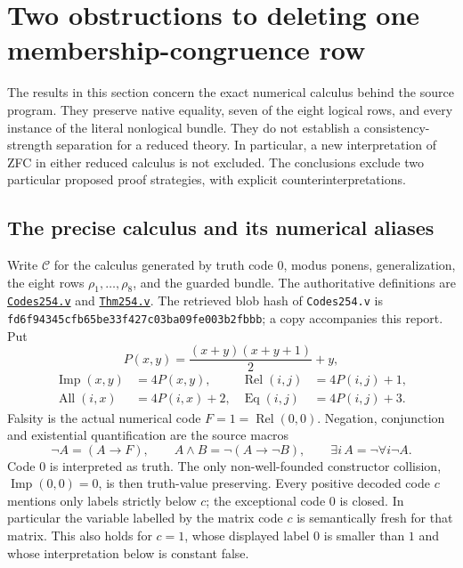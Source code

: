 \section{Two obstructions to deleting one membership-congruence row}
\label{sec:one-row-obstructions}

The results in this section concern the exact numerical calculus behind
the source program. They preserve native equality, seven of the eight
logical rows, and every instance of the literal nonlogical bundle. They
do not establish a consistency-strength separation for a reduced theory.
In particular, a new interpretation of ZFC in either reduced calculus is
not excluded. The conclusions exclude two particular proposed proof
strategies, with explicit counterinterpretations.

\subsection{The precise calculus and its numerical aliases}

Write $\mathcal C$ for the calculus generated by truth code $0$, modus
ponens, generalization, the eight rows $\rho_1,\ldots,\rho_8$, and the
guarded bundle. The authoritative definitions are
\href{https://github.com/jeff87654/busy-beaver/blob/zf-254/ZF/m254/coq/logic/Codes254.v}{\texttt{Codes254.v}}
and
\href{https://github.com/jeff87654/busy-beaver/blob/zf-254/ZF/m254/coq/logic/Thm254.v}{\texttt{Thm254.v}}.
The retrieved blob hash of \texttt{Codes254.v} is
\texttt{fd6f94345cfb65be33f427c03ba09fe003b2fbbb}; a copy accompanies this
report. Put
\[
 P(x,y)=\frac{(x+y)(x+y+1)}2+y,
\]
\[
 \begin{aligned}
 \operatorname{Imp}(x,y)&=4P(x,y),&
 \operatorname{Rel}(i,j)&=4P(i,j)+1,\\
 \operatorname{All}(i,x)&=4P(i,x)+2,&
 \operatorname{Eq}(i,j)&=4P(i,j)+3.
 \end{aligned}
\]
Falsity is the actual numerical code
$F=1=\operatorname{Rel}(0,0)$. Negation, conjunction and existential
quantification are the source macros
\[
 \neg A=(A\to F),\qquad
 A\land B=\neg(A\to\neg B),\qquad
 \exists i\,A=\neg\forall i\neg A.
\]
Code $0$ is interpreted as truth. The only non-well-founded constructor
collision, $\operatorname{Imp}(0,0)=0$, is then truth-value preserving.
Every positive decoded code $c$ mentions only labels strictly below $c$;
the exceptional code $0$ is closed. In particular the variable labelled
by the matrix code $c$ is semantically fresh for that matrix. This also
holds for $c=1$, whose displayed label $0$ is smaller than $1$ and whose
interpretation below is constant false.

